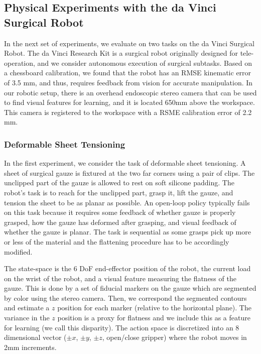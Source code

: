 \subsection{Physical Experiments with the da Vinci Surgical Robot}
In the next set of experiments, we evaluate \hirl on two tasks on the da Vinci Surgical Robot.
The da Vinci Research Kit is a surgical robot originally designed for tele-operation, and we consider autonomous execution of surgical subtasks.
Based on a chessboard calibration, we found that the robot has an RMSE kinematic error of 3.5 mm, and thus, requires feedback from vision for accurate manipulation. 
In our robotic setup, there is an overhead endoscopic stereo camera that can be used to find visual features for learning, and it is located 650mm above the workspace.
This camera is registered to the workspace with a RSME calibration error of 2.2 mm.

\subsubsection{Deformable Sheet Tensioning} In the first experiment, we consider the task of deformable sheet tensioning.  A sheet of surgical gauze is fixtured at the two far corners using a pair of clips. The unclipped part of the gauze is allowed to rest on soft silicone padding. The robot's task is to reach for the unclipped part, grasp it, lift the gauze, and tension the sheet to be as planar as possible.
An open-loop policy typically fails on this task because it requires some feedback of whether gauze is properly grasped, how the gauze has deformed after grasping, and visual feedback of whether the gauze is planar.
The task is sequential as some grasps pick up more or less of the material and the flattening procedure has to be accordingly modified.

The state-space is the 6 DoF end-effector position of the robot, the current load on the wrist of the robot, and a visual feature measuring the flatness of the gauze.
This is done by a set of fiducial markers on the gauze which are segmented by color using the stereo camera.
Then, we correspond the segmented contours and estimate a $z$ position for each marker (relative to the horizontal plane).
The variance in the $z$ position is a proxy for flatness and we include this as a feature for learning (we call this disparity).
The action space is discretized into an 8 dimensional vector ($\pm x$, $\pm y$, $\pm z$, open/close gripper) where the robot moves in 2mm increments.


